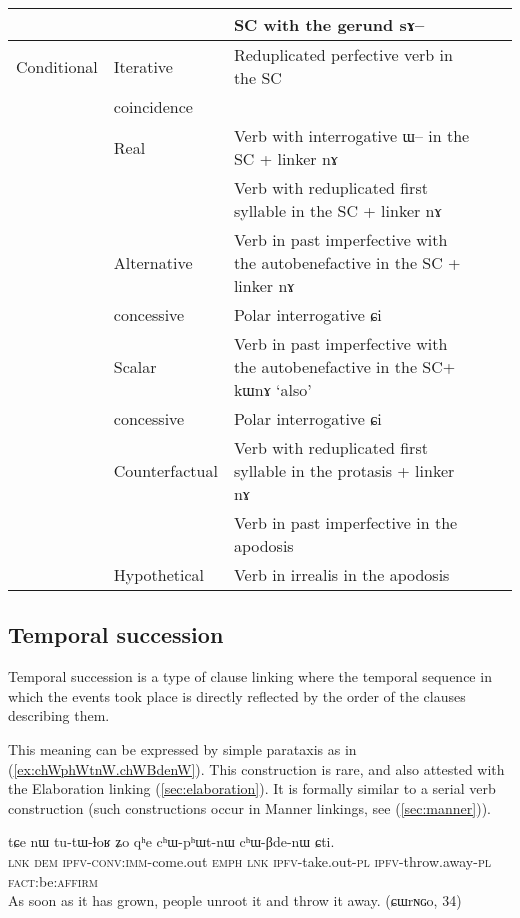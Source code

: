 \documentclass[oldfontcommands,oneside,a4paper,11pt]{article}
\newcommand{\ipa}[1]{{\phon \mbox{#1}}} %
\newcommand{\refb}[1]{(\ref{#1})}
\begin{document}
\begin{table}[h]
{\begin{tabular}{lllll}
      &&SC with the \textbf{gerund} \ipa{sɤ--} \\
\midrule
Conditional &Iterative& Reduplicated perfective verb in the SC\\
&coincidence\\
&Real& Verb with interrogative \ipa{ɯ--} in the SC + linker \ipa{nɤ} \\
& & Verb with reduplicated first syllable in the SC + linker \ipa{nɤ} \\
& Alternative   & Verb in past  imperfective with the autobenefactive in the SC + linker \ipa{nɤ}\\
& concessive& Polar interrogative \ipa{ɕi} \\
& Scalar   & Verb in past  imperfective with the autobenefactive  in the SC+  \ipa{kɯnɤ} `also'\\
& concessive& Polar interrogative \ipa{ɕi} \\
& Counterfactual& Verb with reduplicated first syllable in the protasis + linker \ipa{nɤ} \\
&  & Verb in past imperfective in the apodosis   \\
& Hypothetical &  Verb in irrealis in the apodosis   \\
\bottomrule
\end{tabular}}
\end{table}
\subsection{Temporal succession}  \label{sec:temporal.succession}



Temporal succession is a type of clause linking where the temporal sequence in which the events  took place is directly reflected by the order of the clauses describing them.   

This meaning can be expressed by simple parataxis as in \refb{ex:chWphWtnW.chWBdenW}. This construction is rare, and also attested with the Elaboration linking \refb{sec:elaboration}. It is formally similar to a serial verb construction (such constructions occur in Manner linkings, see \refb{sec:manner}).
\begin{exe}
\ex \label{ex:chWphWtnW.chWBdenW}
\gll 
\ipa{tɕe}  	\ipa{nɯ}  	\ipa{tu-tɯ-ɬoʁ}  	\ipa{ʑo}  	\ipa{qʰe}  	\ipa{cʰɯ-pʰɯt-nɯ}  	\ipa{cʰɯ-βde-nɯ}  	\ipa{ɕti.}  \\
\textsc{lnk} \textsc{dem} \textsc{ipfv-conv:imm}-come.out \textsc{emph} \textsc{lnk} \textsc{ipfv}-take.out-\textsc{pl} \textsc{ipfv}-throw.away-\textsc{pl}  \textsc{fact}:be:\textsc{affirm} \\
\glt As soon as it has grown, people unroot it and throw it away. (ɕɯrɴɢo, 34)
\end{exe}
\end{document}
